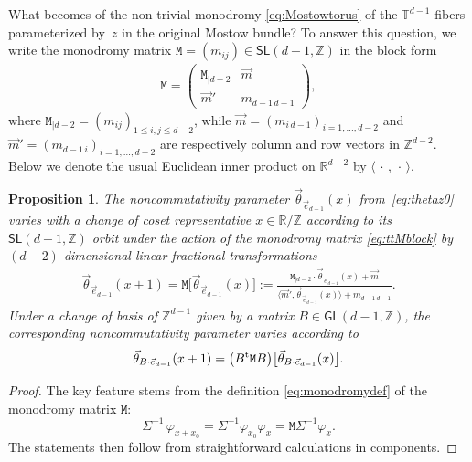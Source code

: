 \documentclass[pdftex]{sigma}
\numberwithin{equation}{section}
\newcommand{\Z}{\zed}
\newcommand{\sfGL}{\mathsf{GL}}
\newcommand{\sfSL}{\mathsf{SL}}
\newcommand{\ttM}{\mathtt{M}}
\newcommand{\R}{\real}
\newcommand{\zed}{{\mathbb Z}} %
\newcommand{\real}{{\mathbb R}} %
\newcommand{\torus}{{\mathbb T}} %
\newtheorem{Proposition}[Theorem]{Proposition}
 { \theoremstyle{definition}
\newtheorem{Definition}[Theorem]{Definition}
\newtheorem{Note}[Theorem]{Note}
\newtheorem{Example}[Theorem]{Example}
\newtheorem{Remark}[Theorem]{Remark} }
\begin{document}
What becomes of the non-trivial monodromy \eqref{eq:Mostowtorus} of
the $\torus^{d-1}$ fibers parameterized by~$z$ in the original Mostow
bundle? To answer this question, we write the monodromy matrix
$\ttM=(m_{ij})\in\sfSL(d-1,\Z)$ in the block form
\begin{gather}\label{eq:ttMblock}
\ttM = \left(\begin{matrix} \ttM_{|d-2} & \vec m \\
\vec m' & m_{d-1 \, d-1}
\end{matrix}\right) ,
\end{gather}
where $\ttM_{|d-2}=(m_{ij})_{1\leq i,j\leq d-2}$, while $\vec m=(m_{i \,
 d-1})_{i=1,\dots,d-2}$ and $\vec m' = (m_{d-1 \,
 i})_{i=1,\dots,d-2}$ are respectively column and row vectors in $\Z^{d-2}$. Below
we denote the usual Euclidean inner product on $\R^{d-2}$ by
$\langle\,\cdot\,,\,\cdot\,\rangle$.
\begin{Proposition}\label{prop:monodromyprop}
The noncommutativity parameter
$\vec\theta_{\vec e_{d-1}}(x)$ from~\eqref{eq:thetaz0} varies with a
change of coset representative $x\in\R/\Z$ according to its
$\sfSL(d-1,\Z)$ orbit under the action of the monodromy matrix
\eqref{eq:ttMblock} by $(d{-}2)$-dimensional linear fractional transformations
\begin{gather}\label{eq:thetaMoritagen}
\vec\theta_{\vec e_{d-1}}(x+1) = \ttM\big[\vec\theta_{\vec
 e_{d-1}}(x)\big] :=
\frac{\ttM_{|d-2}\cdot\vec\theta_{\vec e_{d-1}}(x) + \vec m}
{\big\langle \vec m',\vec\theta_{\vec e_{d-1}}(x)\big\rangle + m_{d-1 \,
 d-1}} .
\end{gather}
Under a change of basis of $\Z^{d-1}$ given
by a matrix $B\in\sfGL(d-1,\Z)$, the corresponding noncommutativity
parameter varies according to
\[
\vec\theta_{B\cdot\vec e_{d-1}}(x+1) = \big(B^{\rm
 t} \ttM B\big)\big[\vec\theta_{B\cdot\vec e_{d-1}}(x)\big] .
\]
\end{Proposition}
\begin{proof}
The key feature stems from the definition \eqref{eq:monodromydef} of the monodromy matrix
$\ttM$:
\[
\Sigma^{-1}\,\varphi_{x+x_0} = \Sigma^{-1} \varphi_{x_0} \varphi_x =
\ttM \Sigma^{-1} \varphi_x .
\]
The statements then follow from straightforward calculations in components.
\end{proof}
\end{document}

